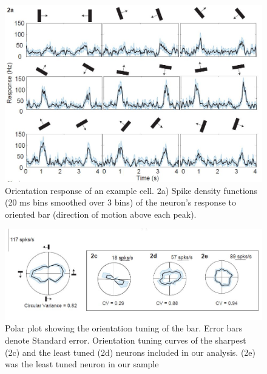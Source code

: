 	\begin{figure}
		
		\includegraphics[width=\linewidth]{SCOriResp.jpg}
		\caption{Orientation response of an example cell.
			2a) Spike density functions (20 ms bins smoothed over
			3 bins) of the neuron’s response to oriented bar (direction
			of motion above each peak).}
		\label{fig:fig2}
	\end{figure}
	
	
	\begin{figure}
		\includegraphics[width=\linewidth]{SCOriTuning.jpg}
		\caption{Polar plot showing
			the orientation tuning of the bar. Error bars denote
			Standard error. Orientation tuning curves of the
			sharpest (2c) and the least tuned (2d) neurons
			included in our analysis. (2e) was the least tuned
			neuron in our sample}
		\label{fig:fig3}			
	\end{figure}
	

